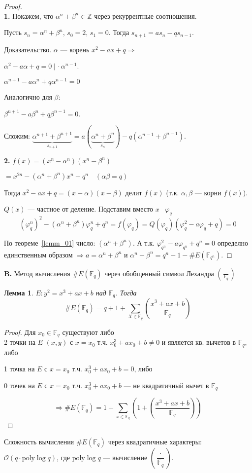 \documentclass[12pt]{article}
\newcommand{\Z}{{{\mathbb Z}}}
\newcommand{\F}{{{\mathbb F}}}
\newcommand{\bigO}{\mathcal{O}}
\newtheorem{lemma}[theorem]{Лемма}
\theoremstyle{definition}
\theoremstyle{definition}
\theoremstyle{definition}
\begin{document}
\begin{proof}
$ $\\
\textbf{1. } Покажем, что ${\alpha^n} + {\beta ^n} \in \Z$ через рекуррентные соотношения.

Пусть ${s_n} = {\alpha ^n} + {\beta ^n}$, ${s_0} = 2$, ${s_1} = 0$. Тогда $s_{n + 1} = a{s_n} - qs_{n - 1}.$

Доказательство. $\alpha $ — корень $x^2 - ax + q \Rightarrow $

${\alpha ^2} - a \alpha + q = 0 \ |\ \cdot {\alpha^{n - 1}}$. 

${\alpha ^{n + 1}} - a{\alpha ^n} + q{\alpha ^{n - 1}} = 0$

Аналогично для $\beta $: 

${\beta ^{n+1}} - a {\beta ^n} + q{\beta ^{n - 1}} = 0$. 

Сложим: $\underbrace {{\alpha ^{n + 1}} + \beta ^{n + 1}}_{s_{n + 1}} = a ( {\underbrace {{\alpha^n} + {\beta ^n}}_{{s_n}}} ) - q( {{\alpha ^{n - 1}} + {\beta ^{n - 1}}} ).$

\textbf{2.} $f( x ) = ( {{x^n} - {\alpha^n}} ){( {{x^n} - {\beta ^n}} )}$

$ = {x^{2n}} - ( \alpha^n + \beta^n ){x^n} + {q^n}\quad ( \alpha\beta  = q )$

Тогда ${x^2} - ax + q = ( {x - \alpha } )( {x - \beta } )$ делит $f( x )$ (т.к. $\alpha, \beta $ — корни $f(x)$). 

$Q( x )$ — частное от деление. Подставим вместо $x$ \ $\varphi_q$
$$
( {\varphi _q^n} )^2 - ( {{\alpha^n} + {\beta ^n}} )\varphi _q^n + {q^n} = f( {{\varphi_q}} ) = Q( {{\varphi _q}} )( {\varphi _q^2 - a{\varphi _q} + q} ) = 0
$$

По теореме~\ref{lemm_01} число: $(\alpha^n + \beta^n )$. А т.к. $\varphi _{{q^n}}^2 - {a\varphi _{q^n}} + {q^n} = 0$  определно единственным образом $ \Rightarrow a = {\alpha ^n} + {\beta ^n}$ и ${\alpha ^n} + {\beta ^n} = {q^n} + 1 - \# E( {{\F_{q^n}}} )$. 
\end{proof}

\textbf{B.} Метод вычисления $\# E( \F_q )$ через обобщенный символ Лехандра $\left( {\frac{ \cdot }{{{\F_q}}}} \right)$

\begin{lemma}
	\label{lemm_03}
	$E:{y^2} = {x^3} + ax + b$ над ${\F_q}$. Тогда
	$$
	\# E( \F_q ) = q + 1 + \sum\limits_{X \in {\F_q}} {\left( {\frac{{{x^3} + ax + b}}{{{\F_q}}}} \right)} 
	$$
\end{lemma}

\begin{proof}Для  $x_0 \in \F_q $ существуют либо \\2 точки на $E$ $( {x,y} )$ с $x = {x_0}$ т.ч. $x_0^3 + a{x_0} + b \ne 0$ и является кв. вычетов в ${\F_q}$, либо

1 точка на $E$ с $x = {x_0}$ т.ч.  $x_0^3 + a{x_0} + b = 0$, либо

$0$ точек на $E$ с $x = {x_0}$ т.ч. $x_0^3 + a{x_0} + b$ — не квадратичный вычет в ${\F_q}$

$$
\Rightarrow \# E( \F_q ) = 1 + \sum\limits_{x \in {\F_q}} {\left( {1 + \left( {\frac{{x^3} + ax + b}{\F_q}} \right)} \right)}
$$
\end{proof}

Сложность вычисления $\# E( \F_q )$  через квадратичные характеры: $\bigO( {q \cdot {\text{poly}} \log q} )$,
где ${\text{poly}} \log q$ — вычисление $\left( {\dfrac{ \cdot }{\F_q}} \right)$.
\end{document}

